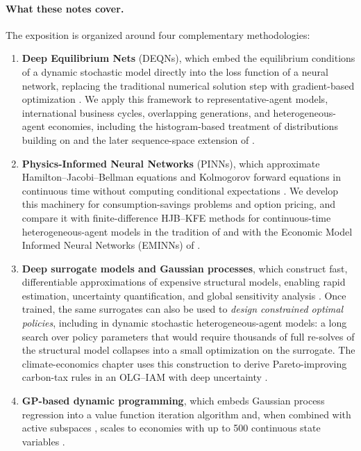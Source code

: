 \documentclass[11pt,a4paper]{report}
\begin{document}
\paragraph{What these notes cover.}
The exposition is organized around four complementary methodologies:
\begin{enumerate}[itemsep=2pt]
\item \textbf{Deep Equilibrium Nets} (DEQNs), which embed the equilibrium conditions of a dynamic stochastic model directly into the loss function of a neural network, replacing the traditional numerical solution step with gradient-based optimization \citep{azinovicDEEPEQUILIBRIUMNETS2022}.  We apply this framework to representative-agent models, international business cycles, overlapping generations, and heterogeneous-agent economies, including the histogram-based treatment of distributions building on \citet{young2010} and the later sequence-space extension of \citet{azinovicyangzemlicka2025sequencespace}.
\item \textbf{Physics-Informed Neural Networks} (PINNs), which approximate Hamilton--Jacobi--Bellman equations and Kolmogorov forward equations in continuous time without computing conditional expectations \citep{sirignano2018dgm, raissi2019physics}.  We develop this machinery for consumption-savings problems and option pricing, and compare it with finite-difference HJB--KFE methods for continuous-time heterogeneous-agent models in the tradition of \citet{achdou2022income} and with the Economic Model Informed Neural Networks (EMINNs) of \citet{gu2024masterequations}.
\item \textbf{Deep surrogate models and Gaussian processes}, which construct fast, differentiable approximations of expensive structural models, enabling rapid estimation, uncertainty quantification, and global sensitivity analysis \citep{SCHEIDEGGER201968, chen2025Deep}.  Once trained, the same surrogates can also be used to \emph{design constrained optimal policies}, including in dynamic stochastic heterogeneous-agent models: a long search over policy parameters that would require thousands of full re-solves of the structural model collapses into a small optimization on the surrogate.  The climate-economics chapter uses this construction to derive Pareto-improving carbon-tax rules in an OLG--IAM with deep uncertainty \citep{kubler2025using}.
\item \textbf{GP-based dynamic programming}, which embeds Gaussian process regression into a value function iteration algorithm \citep{engel2005reinforcement, deisenroth2009gaussian, rennerscheidegger_2018} and, when combined with active subspaces \citep{constantine2015active}, scales to economies with up to 500 continuous state variables \citep{SCHEIDEGGER201968}.
\end{enumerate}
\end{document}
